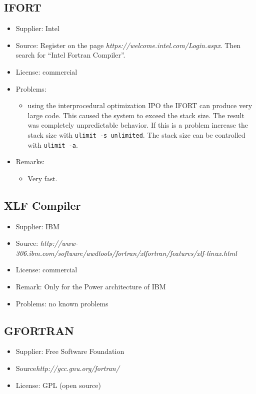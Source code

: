 \documentclass[a4paper,10pt]{report}
\newcommand{\mytt}[1]{{\tt #1}}
\begin{document}
\subsection{IFORT}
\begin{itemize}
\item Supplier: Intel
\item Source: Register on the 
page \textit{https://welcome.intel.com/Login.aspx}.
Then search for  ``Intel Fortran Compiler''.
\item License: commercial
\item Problems: 
\begin{itemize}
\item using the interprocedural optimization IPO the IFORT can produce
very large code. This caused the system to exceed the stack size. The
result was completely unpredictable behavior. If this is a problem
increase the stack size with \mytt{ulimit -s unlimited}. The stack
size can be controlled with \mytt{ulimit -a}.
\end{itemize}
\item Remarks:
\begin{itemize}
\item Very fast.
\end{itemize}
\end{itemize}


\subsection{XLF Compiler}
\begin{itemize}
\item Supplier: IBM
\item Source: \textit{http://www-306.ibm.com/software/awdtools/fortran/xlfortran/features/xlf-linux.html}
\item License: commercial
\item Remark: Only for the Power architecture of IBM
\item Problems: no known problems
\end{itemize}

\subsection{GFORTRAN}
\begin{itemize}
\item Supplier: Free Software Foundation
\item Source\textit{http://gcc.gnu.org/fortran/}
\item License: GPL (open source)
\end{itemize}
\end{document}
